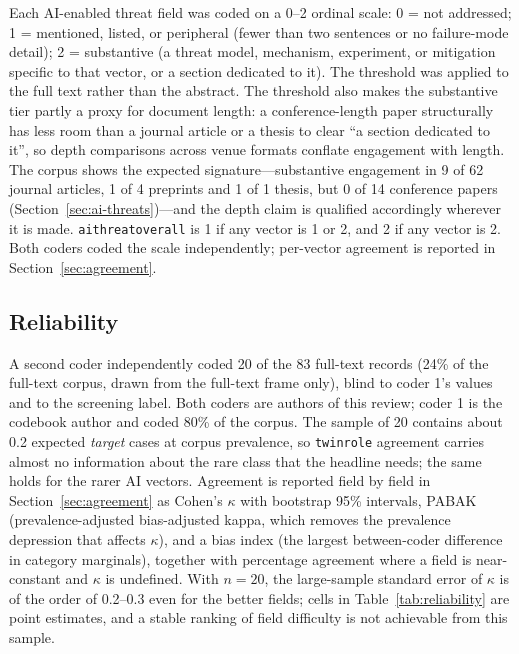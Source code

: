 \documentclass[preprint,12pt]{elsarticle}
\renewcommand{\_}{\plainunderscore\allowbreak}
\begin{document}
Each AI-enabled threat field was coded on a 0--2 ordinal scale: 0 = not addressed; 1 =
mentioned, listed, or peripheral (fewer than two sentences or no failure-mode detail);
2 = substantive (a threat model, mechanism, experiment, or mitigation specific to that
vector, or a section dedicated to it). The threshold was applied to the full text rather than
the abstract. The threshold also makes the substantive tier partly a proxy for document
length: a conference-length paper structurally has less room than a journal article or a
thesis to clear ``a section dedicated to it'', so depth comparisons across venue formats
conflate engagement with length. The corpus shows the expected signature---substantive
engagement in 9 of 62 journal articles, 1 of 4 preprints and 1 of 1 thesis, but 0 of 14
conference papers (Section~\ref{sec:ai-threats})---and the depth claim is qualified
accordingly wherever it is made. \texttt{ai\_threat\_overall} is 1 if any vector is 1 or 2, and 2 if any vector
is 2. Both coders coded the scale independently; per-vector agreement is reported in
Section~\ref{sec:agreement}.

\subsection{Reliability}\label{sec:reliability}

A second coder independently coded 20 of the 83 full-text records (24\% of the full-text
corpus, drawn from the full-text frame only), blind to coder 1's values and to the screening
label. Both coders are authors of this review; coder 1 is the codebook author and coded 80\%
of the corpus. The sample of 20 contains about 0.2 expected \emph{target} cases at corpus
prevalence, so \texttt{twin\_role} agreement carries almost no information about the rare
class that the headline needs; the same holds for the rarer AI vectors. Agreement is reported
field by field in Section~\ref{sec:agreement} as Cohen's $\kappa$ with bootstrap 95\%
intervals, PABAK (prevalence-adjusted bias-adjusted kappa, which removes the prevalence
depression that affects $\kappa$), and a bias index (the largest between-coder difference in
category marginals), together with percentage agreement where a field is near-constant and
$\kappa$ is undefined. With $n = 20$, the large-sample standard error of $\kappa$ is of the
order of 0.2--0.3 even for the better fields; cells in Table~\ref{tab:reliability} are
point estimates, and a stable ranking of field difficulty is not achievable from this
sample.
\end{document}
